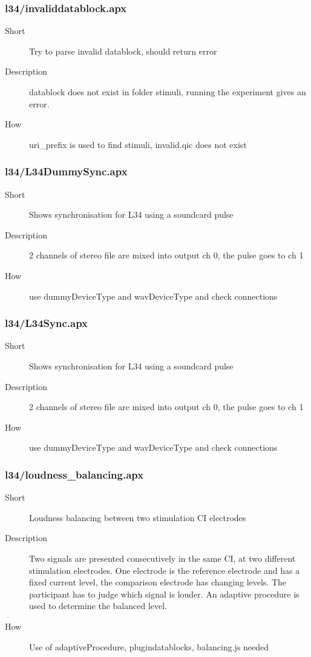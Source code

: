 \subsubsection{l34/invaliddatablock.apx}
\begin{description}
\item[Short] 
 Try to parse invalid datablock, should return error
\item[Description] 
 datablock does not exist in folder stimuli, running the experiment gives an error.
\item[How] 
 uri\_prefix is used to find stimuli, invalid.qic does not exist
\end{description}

\subsubsection{l34/L34DummySync.apx}
\begin{description}
\item[Short] 
        Shows synchronisation for L34 using a soundcard pulse
\item[Description] 
         2 channels of stereo file are mixed into output ch 0, the pulse goes to ch 1
\item[How] 
 use dummyDeviceType and wavDeviceType and check connections
\end{description}

\subsubsection{l34/L34Sync.apx}
\begin{description}
\item[Short] 
        Shows synchronisation for L34 using a soundcard pulse
\item[Description] 
         2 channels of stereo file are mixed into output ch 0, the pulse goes to ch 1
\item[How] 
 use dummyDeviceType and wavDeviceType and check connections
\end{description}

\subsubsection{l34/loudness\_balancing.apx}
\begin{description}
\item[Short] 
 Loudness balancing between two stimulation CI electrodes
\item[Description] 
 Two signals are presented consecutively in the same CI, at two different stimulation electrodes. One electrode is the reference electrode and has a fixed current level, the comparison electrode has changing levels. The participant has to judge which signal is louder. An adaptive procedure is used to determine the balanced level.
\item[How] 
 Use of adaptiveProcedure, plugindatablocks, balancing.js needed
\end{description}


